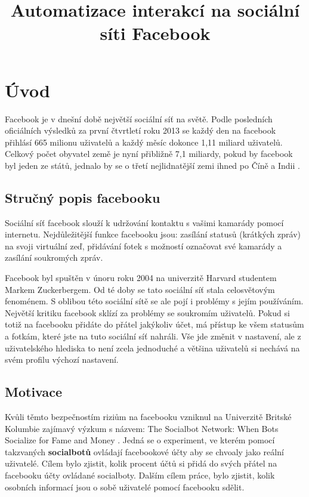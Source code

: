 \documentclass[thesis=M,czech]{FITthesis}[2013/05/10]
\title{Automatizace interakcí na sociální síti Facebook}
\begin{document}


\chapter{{\' U}vod}

Facebook je v dnešní době největší sociální síť na světě. Podle posledních oficiálních výsledků \cite{web:fbMonthlyActiveUsers} za první čtvrtletí roku 2013 se každý den na facebook přihlásí 665 milionu uživatelů a každý měsíc dokonce 1,11 miliard uživatelů. Celkový počet obyvatel země je nyní přibližně 7,1 miliardy, pokud by facebook byl jeden ze států, jednalo by se o třetí nejlidnatější zemi ihned po Číně a Indii \cite{web:socialbotNetwork}.

\section{Stručný popis facebooku}

Sociální síť facebook slouží k udržování kontaktu s vašimi kamarády pomocí internetu. Nejdůležitější funkce facebooku jsou: zasílání statusů (krátkých zpráv) na svoji virtuální zeď, přidávání fotek s možností označovat své kamarády a zasílání soukromých zpráv.

Facebook byl spuštěn v únoru roku 2004 na univerzitě Harvard studentem Markem Zuckerbergem. Od té doby se tato sociální síť stala celosvětovým fenoménem. S oblibou této sociální sítě se ale pojí i problémy s jejím používáním. Největší kritiku facebook sklízí za problémy se soukromím uživatelů. Pokud si totiž na facebooku přidáte do přátel jakýkoliv účet, má přístup ke všem statusům a fotkám, které jste na tuto sociální síť nahráli. Vše jde změnit v nastavení, ale z uživatelského hlediska to není zcela jednoduché a většina uživatelů si nechává na svém profilu výchozí nastavení.

\section{Motivace}

Kvůli těmto bezpečnostím riziům na facebooku vzniknul na Univerzitě Britské Kolumbie zajímavý výzkum s názvem: The Socialbot Network:
When Bots Socialize for Fame and Money \cite{web:socialbotNetwork}. Jedná se o experiment, ve kterém pomocí takzvaných \textbf{socialbotů} ovládají facebookové účty aby se chvoaly jako reální uživatelé. Cílem bylo zjistit, kolik procent účtů si přidá do svých přátel na facebooku účty ovládané socialboty. Dalším cílem práce, bylo zjistit, kolik osobních informací jsou o sobě uživatelé pomocí facebooku sdělit.
\end{document}
